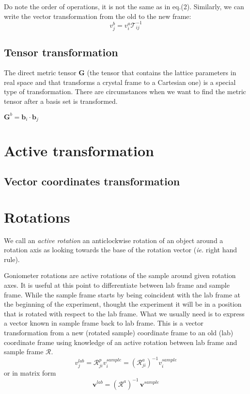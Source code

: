 \documentclass{article}
\begin{document}
Do note the order of operations, it is not the same as in eq.(2). Similarly, we can write the vector transformation from the old to the new frame:
\begin{equation}
    v^b_j = v^a_i \mathcal{T}^{-1}_{ij}
\end{equation}



\subsection{Tensor transformation}
The direct metric tensor $\mathbf{G}$ (the tensor that contains the lattice parameters in real space and that transforms a crystal frame to a Cartesian one) is a special type of transformation. There are circumstances when we want to find the metric tensor after a basis set is transformed.

$\mathbf{G}^b = \mathbf{b}_i \cdot \mathbf{b}_j$


\section{Active transformation}
\subsection{Vector coordinates transformation}


\section{Rotations}
We call an \textit{active rotation} an anticlockwise rotation of an object around a rotation axis as looking towards the base of the rotation vector (\textit{ie.} right hand rule).

Goniometer rotations are active rotations of the sample around given rotation axes. It is useful at this point to differentiate between lab frame and sample frame. While the sample frame starts by being coincident with the lab frame at the beginning of the experiment, thought the experiment it will be in a position that is rotated with respect to the lab frame. What we usually need is to express a vector known in sample frame back to lab frame. This is a vector transformation from a new (rotated sample) coordinate frame to an old (lab) coordinate frame using knowledge of an active rotation between lab frame and sample frame $\mathcal{R}$.
\begin{equation}
    v_j^{lab}=\mathcal{R}^p_{ji} v_i^{sample}= (\mathcal{R}^a_{ji})^{-1} v_i^{sample}
\end{equation}
or in matrix form
\begin{equation}
    \mathbf{v}^{lab}=(\mathcal{R}^a)^{-1} \, \mathbf{v}^{sample}
\end{equation}
\end{document}

